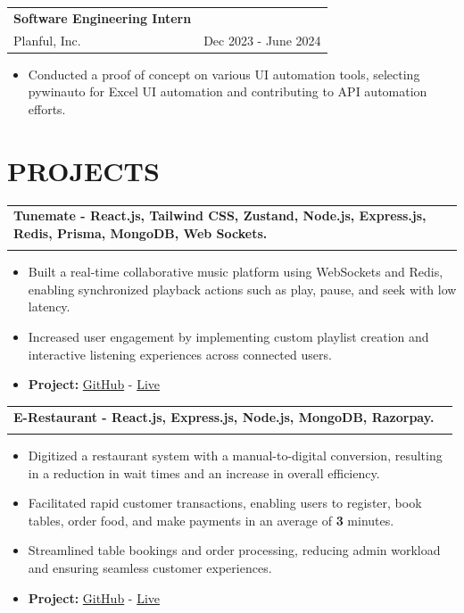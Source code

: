 \documentclass[10pt, a4paper]{article}
\makeatletter
\newcommand{\resumeSubheading}[4]{%
  \vspace{0.6mm}%
  \begin{tabular*}{0.98\textwidth}[t]{l@{\extracolsep{\fill}}r}%
      \textbf{#1} & \footnotesize{#4} \\%
    \footnotesize{#3} & \fontsize{9}{10}\selectfont#2%
  \end{tabular*}%
  \vspace{-2.4mm}%
}
\makeatother
\begin{document}
\vspace{-3.0mm}

\resumeSubheading
{Software Engineering Intern}{ Dec 2023 - June 2024 }{
  Planful, Inc.
}{}

\begin{itemize}[itemsep=-5pt]
  \item Conducted a proof of concept on various UI automation tools, selecting pywinauto for Excel UI automation and contributing to API automation efforts.
\end{itemize}

\vspace{-3.0mm}
\section{\textbf{PROJECTS}}

\resumeSubheading
{Tunemate \fontsize{9}{9}\selectfont\fontseries{l}\selectfont - React.js, Tailwind CSS, Zustand, Node.js, Express.js, Redis, Prisma, MongoDB, Web Sockets.}{} {}{}
\vspace{-4.2mm}

\begin{itemize}[itemsep=-4pt]
  \item Built a real-time collaborative music platform using WebSockets and Redis, enabling synchronized playback actions such as play, pause, and seek with low latency.
  \item Increased user engagement by implementing custom playlist creation and interactive listening experiences across connected users.
  \item \textbf{Project: } \href{https://github.com/ikarthik21/tunemate}{GitHub} - \href{https://tunemate.vercel.app/}{Live}
\end{itemize}

\vspace{-2.0mm}

\resumeSubheading
{E-Restaurant \fontsize{9}{9}\selectfont\fontseries{l}\selectfont - React.js, Express.js, Node.js, MongoDB, Razorpay.}{} {}{}
\vspace{-4.2mm}

\begin{itemize}[itemsep=-4pt]
  \item Digitized a restaurant system with a manual-to-digital conversion, resulting in a reduction in wait times and an increase in overall efficiency.
  \item Facilitated rapid customer transactions, enabling users to register, book tables, order food, and make payments in an average of \textbf{3} minutes.
  \item Streamlined table bookings and order processing, reducing admin workload and ensuring seamless customer experiences.
  \item \textbf{Project: } \href{https://github.com/ikarthik21/RestobayFoods}{GitHub} - \href{https://restobayfoods.vercel.app/}{Live}
\end{itemize}
\end{document}
